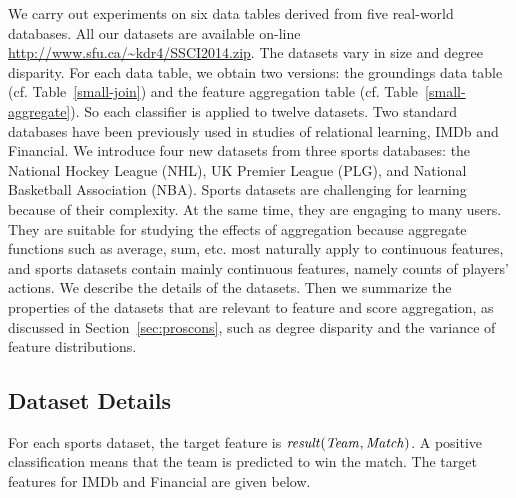 \documentclass[conference]{IEEEtran}
\begin{document}


We carry out experiments on six data tables derived from five real-world databases. All our datasets are available on-line \url{http://www.sfu.ca/~kdr4/SSCI2014.zip}. The datasets vary in size and degree disparity. For each data table, we obtain two versions: the groundings data table (cf. Table~\ref{small-join}) and the feature aggregation table (cf.
Table~\ref{small-aggregate}). So each classifier is applied to twelve datasets.
Two standard databases  have been previously used in studies of relational learning, IMDb and Financial. We introduce four new datasets from three sports databases: the National Hockey League (NHL), UK Premier League (PLG), and National Basketball Association (NBA). Sports datasets are challenging for learning because of their complexity. At the same time, they are engaging to many users. They are suitable for studying the effects of aggregation because aggregate functions such as average, sum, etc. most naturally apply to continuous features, and sports datasets contain mainly continuous features, namely counts of players' actions. We describe the details of the datasets. Then we summarize the properties of the datasets that are relevant to feature and score aggregation, as discussed in Section~\ref{sec:proscons}, such as degree disparity and the variance of feature distributions.

\subsection{Dataset Details}

For each sports dataset, the target feature is $\it{result(Team,Match)}$. A positive classification means that the team is predicted to win the match. The target features for IMDb and Financial are given below.
\end{document}
